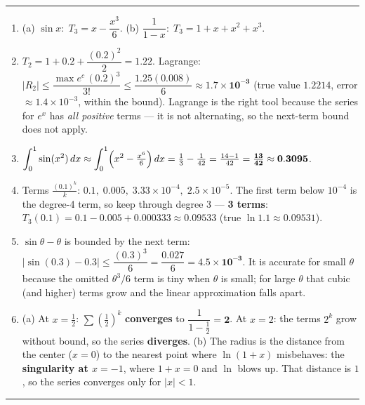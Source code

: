 \documentclass[11pt]{article}
\newcommand{\strand}[1]{%
  \vspace{0.7em}%
  \noindent{\large\textbf{\textcolor{secblue}{#1}}}\par\vspace{0.2em}%
  \noindent\rule{\textwidth}{0.3pt}\par%
}
\begin{document}
\strand{5.\quad Taylor Series}

\begin{enumerate}[leftmargin=2em, itemsep=0.6em, start=20]
\item (a) $\sin x:\; T_3 = x - \dfrac{x^3}{6}$. \;(b) $\dfrac{1}{1-x}:\; T_3 = 1 + x + x^2 + x^3$.

\item $T_2 = 1 + 0.2 + \dfrac{(0.2)^2}{2} = \mathbf{1.22}$. Lagrange: $|R_2| \le \dfrac{\max e^c\,(0.2)^3}{3!} \le \dfrac{1.25(0.008)}{6} \approx \mathbf{1.7\times 10^{-3}}$ (true value $1.2214$, error $\approx 1.4\times10^{-3}$, within the bound). Lagrange is the right tool because the series for $e^x$ has \emph{all positive} terms --- it is not alternating, so the next-term bound does not apply.

\item $\displaystyle\int_0^1 \sin(x^2)\,dx \approx \int_0^1\Bigl(x^2 - \tfrac{x^6}{6}\Bigr)\,dx = \tfrac13 - \tfrac{1}{42} = \tfrac{14-1}{42} = \mathbf{\tfrac{13}{42} \approx 0.3095}$.

\item Terms $\tfrac{(0.1)^k}{k}$: $0.1,\;0.005,\;3.33\times10^{-4},\;2.5\times10^{-5}$. The first term below $10^{-4}$ is the degree-4 term, so keep through degree 3 --- \textbf{3 terms}: $T_3(0.1) = 0.1 - 0.005 + 0.000333 \approx \mathbf{0.09533}$ (true $\ln 1.1 \approx 0.09531$).

\item $\sin\theta - \theta$ is bounded by the next term: $\bigl|\sin(0.3)-0.3\bigr| \le \dfrac{(0.3)^3}{6} = \dfrac{0.027}{6} = \mathbf{4.5\times10^{-3}}$. It is accurate for small $\theta$ because the omitted $\theta^3/6$ term is tiny when $\theta$ is small; for large $\theta$ that cubic (and higher) terms grow and the linear approximation falls apart.

\item (a) At $x=\tfrac12$: $\sum (\tfrac12)^k$ \textbf{converges} to $\dfrac{1}{1-\frac12} = \mathbf{2}$. At $x=2$: the terms $2^k$ grow without bound, so the series \textbf{diverges}. \;(b) The radius is the distance from the center ($x=0$) to the nearest point where $\ln(1+x)$ misbehaves: the \textbf{singularity at $x=-1$}, where $1+x=0$ and $\ln$ blows up. That distance is $1$, so the series converges only for $|x|<1$.
\end{enumerate}

\strand{6.\quad Differential Equations \& Dynamics}
\end{document}
